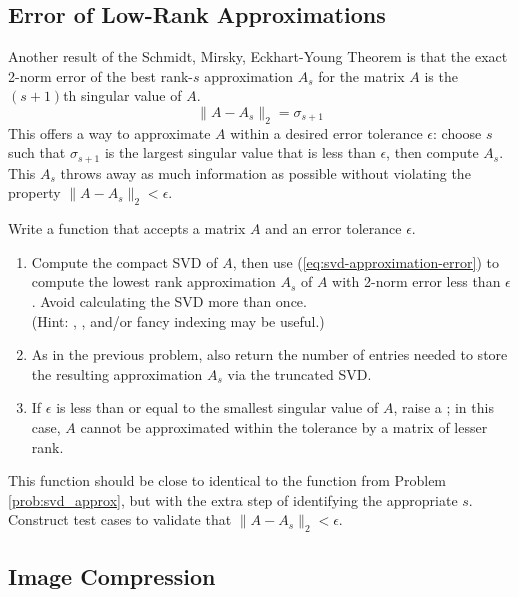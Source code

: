 \subsection*{Error of Low-Rank Approximations} %

Another result of the Schmidt, Mirsky, Eckhart-Young Theorem is that the exact 2-norm error of the best rank-$s$ approximation $A_s$ for the matrix $A$ is the $(s+1)$th singular value of $A$.
%
\begin{equation}
\label{eq:svd-approximation-error}
\|A - A_s\|_2 = \sigma_{s+1}
\end{equation}
%
This offers a way to approximate $A$ within a desired error tolerance $\epsilon$:
choose $s$ such that $\sigma_{s+1}$ is the largest singular value that is less than $\epsilon$, then compute $A_s$.
This $A_s$ throws away as much information as possible without violating the property $\|A - A_s\|_2 < \epsilon$.

\begin{problem} %
Write a function that accepts a matrix $A$ and an error tolerance $\epsilon$.
\begin{enumerate}
\item Compute the compact SVD of $A$, then use (\ref{eq:svd-approximation-error}) to compute the lowest rank approximation $A_s$ of $A$ with 2-norm error less than $\epsilon$.
Avoid calculating the SVD more than once.
\\ (Hint: , , and/or fancy indexing may be useful.)
\item As in the previous problem, also return the number of entries needed to store the resulting approximation $A_s$ via the truncated SVD.
\item If $\epsilon$ is less than or equal to the smallest singular value of $A$, raise a ; in this case, $A$ cannot be approximated within the tolerance by a matrix of lesser rank.
\end{enumerate}
This function should be close to identical to the function from Problem \ref{prob:svd_approx}, but with the extra step of identifying the appropriate $s$.
Construct test cases to validate that $\| A - A_s \|_2 < \epsilon$.
\end{problem}

\subsection*{Image Compression} %

